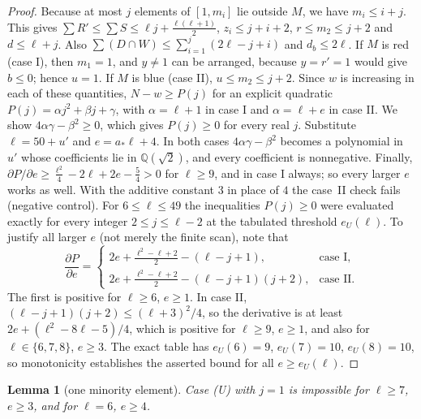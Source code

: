 \documentclass[11pt]{amsart}
\newtheorem{lemma}[theorem]{Lemma}
\theoremstyle{definition}
\begin{document}
\begin{proof}
Because at most $j$ elements of $[1,m_i]$ lie outside $M$, we have $m_i\le i+j$. This gives $\sum R'\le\sum S\le\ell j+\frac{\ell(\ell+1)}2$, $z_i\le j+i+2$, $r\le m_2\le j+2$ and $d\le\ell+j$. Also $\sum(D\cap W)\le\sum_{i=1}^{j}(2\ell-j+i)$ and $d_b\le2\ell$. If $M$ is red (case I), then $m_1=1$, and $y\ne1$ can be arranged, because $y=r'=1$ would give $b\le0$; hence $u=1$. If $M$ is blue (case II), $u\le m_2\le j+2$. Since $w$ is increasing in each of these quantities, $N-w\ge P(j)$ for an explicit quadratic $P(j)=\alpha j^2+\beta j+\gamma$, with $\alpha=\ell+1$ in case I and $\alpha=\ell+e$ in case II. We show $4\alpha\gamma-\beta^2\ge0$, which gives $P(j)\ge0$ for every real $j$. Substitute $\ell=50+u'$ and $e=a_*\ell+4$. In both cases $4\alpha\gamma-\beta^2$ becomes a polynomial in $u'$ whose coefficients lie in $\mathbb Q(\sqrt2)$, and every coefficient is nonnegative. Finally, $\partial P/\partial e\ge\frac{\ell^2}{4}-2\ell+2e-\frac54>0$ for $\ell\ge9$, and in case I always; so every larger $e$ works as well. With the additive constant $3$ in place of $4$ the case~II check fails (negative control). For $6\le\ell\le49$ the inequalities $P(j)\ge0$ were evaluated exactly for every integer $2\le j\le\ell-2$ at the tabulated threshold $e_U(\ell)$. To justify all larger $e$ (not merely the finite scan), note that
\[
\frac{\partial P}{\partial e}=
\begin{cases}
2e+\frac{\ell^2-\ell+2}{2}-(\ell-j+1),&\text{case I},\\
2e+\frac{\ell^2-\ell+2}{2}-(\ell-j+1)(j+2),&\text{case II}.
\end{cases}
\]
The first is positive for $\ell\ge6$, $e\ge1$. In case II, $(\ell-j+1)(j+2)\le(\ell+3)^2/4$, so the derivative is at least $2e+(\ell^2-8\ell-5)/4$, which is positive for $\ell\ge9$, $e\ge1$, and also for $\ell\in\{6,7,8\}$, $e\ge3$. The exact table has $e_U(6)=9$, $e_U(7)=10$, $e_U(8)=10$, so monotonicity establishes the asserted bound for all $e\ge e_U(\ell)$.
\end{proof}

\begin{lemma}[one minority element]\label{lem:one}
Case (U) with $j=1$ is impossible for $\ell\ge7$, $e\ge3$, and for $\ell=6$, $e\ge4$.
\end{lemma}
\end{document}
